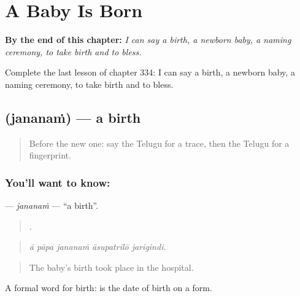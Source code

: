 
\chapter{A Baby Is Born}
\label{ch:te-a-baby-is-born}

\begin{chapteropening}
\textbf{By the end of this chapter:} \emph{I can say a birth, a newborn baby, a naming ceremony, to take birth and to bless.}

Complete the last lesson of chapter 334: I can say a birth, a newborn baby, a naming ceremony, to take birth and to bless.
\end{chapteropening}

\section[\texorpdfstring{\te{జననం} (jananaṁ)}{జననం (jananaṁ)}]{ (jananaṁ) — a birth}

\label{lesson:TE-C334-jananam}



\begin{quote}
Before the new one: say the Telugu for a trace, then the Telugu for a fingerprint.
\end{quote}

\subsection*{You'll want to know: }
\textbf{} — \emph{jananaṁ} — \textquotedblleft{}a birth\textquotedblright{}.

\begin{quote}
    .
\end{quote}

\begin{quote}
\emph{ā pāpa jananaṁ āsupatrilō jarigindi.}
\end{quote}

\begin{quote}
The baby's birth took place in the hospital.
\end{quote}

A formal word for birth:   is the date of birth on a form.

